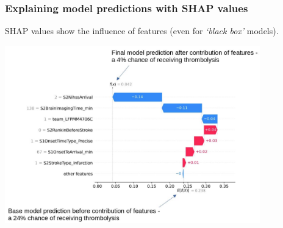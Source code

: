 \documentclass{beamer}
\begin{document}

\begin{frame}
\frametitle{Explaining model predictions with SHAP values}

SHAP values show the influence of features (even for \emph{`black box'} models).

\begin{center}
\includegraphics[width=0.83\textwidth]{./images/xgb_waterfall_low_probability.jpg}
\end{center}
\end{frame}
\end{document}
